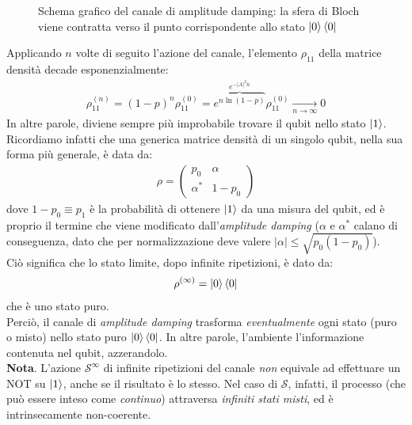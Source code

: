 \documentclass[../../InformazioneQuantistica.tex]{subfiles}
\begin{document}

\begin{figure}[H]
\centering

\caption{Schema grafico del canale di amplitude damping: la sfera di Bloch viene contratta verso il punto corrispondente allo stato $\Ket{0}\Bra{0}$ \label{fig:damping-schema}}
\end{figure}

Applicando $n$ volte di seguito l'azione del canale, l'elemento $\rho_{11}$ della matrice densità decade esponenzialmente:
\begin{align*}
\rho_{11}^{(n)} = (1-p)^n \rho_{11}^{(0)} = \overbrace{e^{n\ln(1-p)}}^{e^{-|A|^2 n}} \rho_{11}^{(0)} \xrightarrow[n\to\infty]{} 0
\end{align*}
In altre parole, diviene sempre più improbabile trovare il qubit nello stato $\Ket{1}$. 
Ricordiamo infatti che una generica matrice densità di un singolo qubit, nella sua forma più generale, è data da:
\begin{align*}
    \rho = \begin{pmatrix}
    p_0 & \alpha\\
    \alpha^* & 1-p_0
    \end{pmatrix}
\end{align*}
dove $1-p_0 \equiv p_1$ è la probabilità di ottenere $\Ket{1}$ da una misura del qubit, ed è proprio il termine che viene modificato dall'\textit{amplitude damping} ($\alpha$ e $\alpha^*$ calano di conseguenza, dato che per normalizzazione deve valere $|\alpha| \leq \sqrt{p_0(1-p_0)}$).\\

Ciò significa che lo stato limite, dopo infinite ripetizioni, è dato da:
\begin{align*}
    \rho^{(\infty)} = \Ket{0}\Bra{0}
\end{align*}
che è uno stato puro.\\
Perciò, il canale di \textit{amplitude damping} trasforma \textit{eventualmente} ogni stato (puro o misto) nello stato puro $\Ket{0}\Bra{0}$. In altre parole, l'ambiente  l'informazione contenuta nel qubit, azzerandolo.\\

\textbf{Nota}. L'azione $\mathcal{S}^\infty$ di infinite ripetizioni del canale \textit{non} equivale ad effettuare un NOT su $\Ket{1}$, anche se il risultato è lo stesso. Nel caso di $\mathcal{S}$, infatti, il processo (che può essere inteso come \textit{continuo}) attraversa \textit{infiniti stati misti}, ed è intrinsecamente non-coerente.
\end{document}
